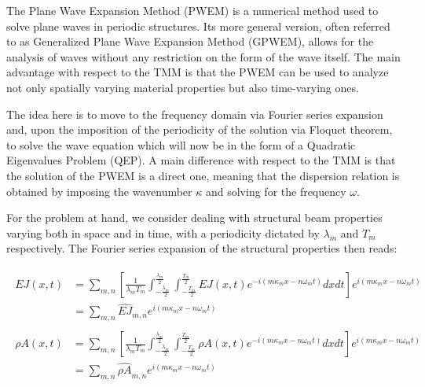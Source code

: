 The Plane Wave Expansion Method (PWEM) is a numerical method used to solve plane waves in periodic structures.
Its more general version, often referred to as Generalized Plane Wave Expansion Method (GPWEM), allows for the analysis of waves without any restriction on the form of the wave itself.
The main advantage with respect to the TMM is that the PWEM can be used to analyze not only spatially varying material properties but also time-varying ones.

The idea here is to move to the frequency domain via Fourier series expansion and, upon the imposition of the periodicity of the solution via Floquet theorem, to solve the wave equation which will now be in the form of a Quadratic Eigenvalues Problem (QEP).
A main difference with respect to the TMM is that the solution of the PWEM is a direct one, meaning that the dispersion relation is obtained by imposing the wavenumber $\kappa$ and solving for the frequency $\omega$.

For the problem at hand, we consider dealing with structural beam properties varying both in space and in time, with a periodicity dictated by $\lambda_m$ and $T_m$ respectively.
The Fourier series expansion of the structural properties then reads:

\begin{equation}
    \begin{aligned}
        \begin{aligned}
            EJ(x, t) & = \sum_{m,n} \left[ \frac{1}{\lambda_m T_m} \int_{-\frac{\lambda_m}{2}}^{\frac{\lambda_m}{2}} \int_{-\frac{T_m}{2}}^{\frac{T_m}{2}} EJ(x, t) e^{-i (m\kappa_m x - n\omega_m t)}dx dt \right] e^{i (m\kappa_m x - n\omega_m t)} \\
                     & = \sum_{m,n} \widehat{EJ}_{m,n} e^{i (m\kappa_m x - n\omega_m t)}
        \end{aligned} \\
        \begin{aligned}
            \rho A(x, t) & = \sum_{m,n} \left[ \frac{1}{\lambda_m T_m} \int_{-\frac{\lambda_m}{2}}^{\frac{\lambda_m}{2}} \int_{-\frac{T_m}{2}}^{\frac{T_m}{2}} \rho A(x, t) e^{-i (m\kappa_m x - n\omega_m t)}dx dt \right] e^{i (m\kappa_m x - n\omega_m t)} \\
                         & = \sum_{m,n} \widehat{\rho A}_{m,n} e^{i (m\kappa_m x - n\omega_m t)}
        \end{aligned}
    \end{aligned}
\end{equation}

